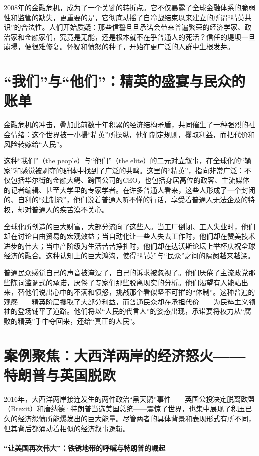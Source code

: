 2008年的金融危机，成为了一个关键的转折点。它不仅暴露了全球金融体系的脆弱性和监管的缺失，更重要的是，它彻底动摇了自冷战结束以来建立的所谓“精英共识”的合法性。人们开始质疑：那些信誓旦旦承诺会带来普遍繁荣的经济学家、政治家和金融家们，究竟是无能，还是根本就不在乎普通人的死活？信任的堤坝一旦崩塌，便很难修复。怀疑和愤怒的种子，开始在更广泛的人群中生根发芽。

\section{“我们”与“他们”：精英的盛宴与民众的账单}

金融危机的冲击，叠加此前数十年积累的经济结构矛盾，共同催生了一种强烈的社会情绪：这个世界被一小撮“精英”所操纵，他们制定规则，攫取利益，而把代价和风险转嫁给“人民”。

这种“我们”（the people）与“他们”（the elite）的二元对立叙事，在全球化的“输家”和感觉被剥夺的群体中找到了广泛的共鸣。这里的“精英”，指向非常广泛：不仅包括华尔街的金融大鳄、跨国公司的CEO，也包括身居高位的政客、主流媒体的记者编辑、甚至大学里的专家学者。在许多普通人看来，这些人形成了一个封闭的、自利的“建制派”，他们说着普通人听不懂的行话，享受着普通人无法企及的特权，却对普通人的疾苦漠不关心。

全球化所创造的巨大财富，大部分流向了这些人。当工厂倒闭、工人失业时，他们却在讨论自由贸易的宏观效益；当自动化让一些人失去工作时，他们却在赞美技术进步的伟大；当中产阶级为生活苦苦挣扎时，他们却在达沃斯论坛上举杯庆祝全球经济的融合。这种认知上的巨大鸿沟，使得“精英”与“民众”之间的隔阂越来越深。

普通民众感觉自己的声音被淹没了，自己的诉求被忽视了。他们厌倦了主流政党那些陈词滥调式的承诺，厌倦了专家们那些脱离现实的分析。他们渴望有人能站出来，替他们说出心中的不满和愤怒，挑战那个看似坚不可摧的“体制”。这种普遍的观感——精英阶层攫取了大部分利益，而普通民众却在承担代价——为民粹主义领袖的登场铺平了道路。他们将以“人民的代言人”的姿态出现，承诺要将权力从“腐败的精英”手中夺回来，还给“真正的人民”。

\section{案例聚焦：大西洋两岸的经济怒火——特朗普与英国脱欧}

2016年，大西洋两岸接连发生的两件政治“黑天鹅”事件——英国公投决定脱离欧盟（Brexit）和唐纳德·特朗普当选美国总统——震惊了世界，也集中展现了积压已久的经济怨愤所能爆发出的巨大能量。尽管两者的具体背景和表现形式有所不同，但其背后都涌动着相似的经济叙事逻辑。

\paragraph*{“让美国再次伟大”：铁锈地带的呼喊与特朗普的崛起}

